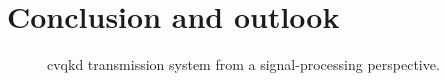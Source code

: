 \chapter*{Conclusion and outlook}


\begin{figure}[htb]
	\centering
	
	\caption{\Gls{cvqkd} transmission system from a signal-processing perspective.}
\end{figure}
